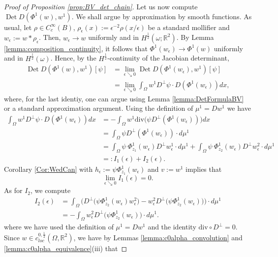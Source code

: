 \documentclass[12pt]{article}
\newcommand{\R}{\mathbb{R}}
\newcommand{\Det}{\operatorname{Det}}
\theoremstyle{plain}
\numberwithin{equation}{section}
\begin{document}
\begin{proof}[Proof of Proposition \ref{prop:BV_det_chain}]
    Let us now compute $\Det D(\Phi^1(w),w^1)$. We shall argue by approximation by smooth functions. As usual, let $\rho \in C^\infty_c(B)$, $\rho_\epsilon(x):=\epsilon^{-2}\rho(x/\epsilon)$ be a standard mollifier and $w_\epsilon := w*\rho_\epsilon$. Then, $w_\epsilon \to w$ uniformly and in $H^\frac12(\omega;\R^2)$. By Lemma \ref{lemma:composition_continuity}, it follows that $\Phi^1(w_\epsilon) \to \Phi^1(w)$ uniformly and in $H^\frac12(\omega)$. Hence, by the $H^\frac12$-continuity of the Jacobian determinant,
    \begin{align*}
        \Det D(\Phi^1(w), w^1)[\psi] &= \lim_{\epsilon \searrow 0} \Det D(\Phi^1(w_\epsilon),w^1)[\psi]\\
        &= \lim_{\epsilon \searrow 0} \int_\Omega w^1 D^\perp \psi \cdot D(\Phi^1(w_\epsilon)) dx,
    \end{align*}
    where, for the last identiy, one can argue using Lemma \ref{lemma:DetFormulaBV} or a standard approximation argument.
    Using the definition of $\mu^1 = Dw^1$ we have
    \begin{align*}
        \int_\Omega w^1 D^\perp \psi \cdot D(\Phi^1(w_\epsilon)) dx &= -\int_\Omega w^1 \mathrm{div} \big(\psi D^\perp (\Phi^1(w_\epsilon))\big) dx\\
        &=\int_\Omega \psi D^\perp (\Phi^1(w_\epsilon)) \cdot d\mu^1\\
        &= \int_\Omega \psi ~ \Phi^1_{z_1}(w_\epsilon) D^\perp w^1_\epsilon \cdot d\mu^1 + \int_\Omega \psi ~ \Phi^1_{z_2}(w_\epsilon) D^\perp w^2_\epsilon \cdot d\mu^1\\
        &=: I_1(\epsilon) + I_2(\epsilon).
    \end{align*}
    Corollary \ref{Cor:WedCan} with $h_\epsilon := \psi \Phi^1_{z_1}(w_\epsilon)$ and $v := w^1$ implies that
    \begin{equation*}
        \lim_{\epsilon \searrow 0} I_1(\epsilon) = 0.
    \end{equation*}
    As for $I_2$, we compute
    \begin{align}
        I_2(\epsilon) &= \int_\Omega \Big( D^\perp \big(\psi \Phi^1_{z_2}(w_\epsilon) w^2_\epsilon\big) - w^2_\epsilon D^\perp (\psi \Phi^1_{z_2}(w_\epsilon)\big)\Big) \cdot d\mu^1 \nonumber\\
        &= -\int_\Omega w^2_\epsilon D^\perp\big(\psi \Phi^1_{z_2}(w_\epsilon)\big) \cdot d\mu^1.\label{eq:I2_w_replaces_weps}
    \end{align}
    where we have used the definition of $\mu^1 = Dw^1$ and the identity $\mathrm{div} \circ D^\perp = 0$. Since $w \in c^{0,\frac{1}{2}}_{{loc}}(\Omega,\R^2)$, we have by Lemmas \ref{lemma:c0alpha_convolution} and \ref{lemma:c0alpha_equivalence}(iii) that

\end{proof}
\end{document}

